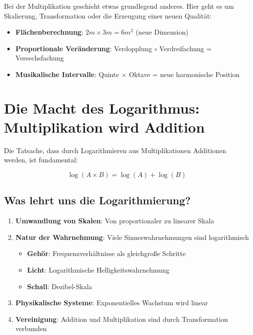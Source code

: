 \documentclass[11pt,a4paper]{article}
\begin{document}
	Bei der Multiplikation geschieht etwas grundlegend anderes. Hier geht es um Skalierung, Transformation oder die Erzeugung einer neuen Qualität:
	
	\begin{itemize}
		\item \textbf{Flächenberechnung}: $2m \times 3m = 6m^2$ (neue Dimension)
		\item \textbf{Proportionale Veränderung}: Verdopplung $\circ$ Verdreifachung = Versechsfachung
		\item \textbf{Musikalische Intervalle}: Quinte $\times$ Oktave = neue harmonische Position
	\end{itemize}
	
	\section{Die Macht des Logarithmus: Multiplikation wird Addition}
	
	Die Tatsache, dass durch Logarithmieren aus Multiplikationen Additionen werden, ist fundamental:
	
	\begin{equation}
		\log(A \times B) = \log(A) + \log(B)
	\end{equation}
	
	\subsection{Was lehrt uns die Logarithmierung?}
	
	\begin{enumerate}
		\item \textbf{Umwandlung von Skalen}: Von proportionaler zu linearer Skala
		\item \textbf{Natur der Wahrnehmung}: Viele Sinneswahrnehmungen sind logarithmisch
		\begin{itemize}
			\item \textbf{Gehör}: Frequenzverhältnisse als gleichgroße Schritte
			\item \textbf{Licht}: Logarithmische Helligkeitswahrnehmung
			\item \textbf{Schall}: Dezibel-Skala
		\end{itemize}
		\item \textbf{Physikalische Systeme}: Exponentielles Wachstum wird linear
		\item \textbf{Vereinigung}: Addition und Multiplikation sind durch Transformation verbunden
	\end{enumerate}
	
\end{document}

